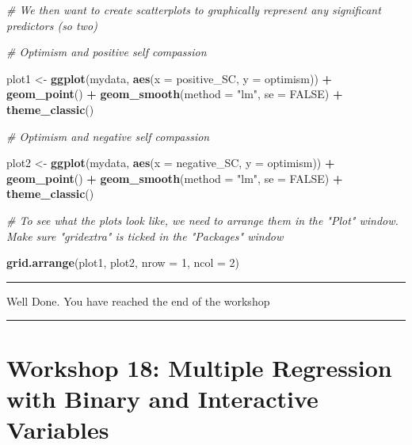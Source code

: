 \documentclass[
]{book}
\newenvironment{Shaded}{\begin{snugshade}}{\end{snugshade}}
\newcommand{\AttributeTok}[1]{\textcolor[rgb]{0.13,0.29,0.53}{#1}}
\newcommand{\CommentTok}[1]{\textcolor[rgb]{0.56,0.35,0.01}{\textit{#1}}}
\newcommand{\ConstantTok}[1]{\textcolor[rgb]{0.56,0.35,0.01}{#1}}
\newcommand{\DecValTok}[1]{\textcolor[rgb]{0.00,0.00,0.81}{#1}}
\newcommand{\FunctionTok}[1]{\textcolor[rgb]{0.13,0.29,0.53}{\textbf{#1}}}
\newcommand{\NormalTok}[1]{#1}
\newcommand{\OtherTok}[1]{\textcolor[rgb]{0.56,0.35,0.01}{#1}}
\newcommand{\SpecialCharTok}[1]{\textcolor[rgb]{0.81,0.36,0.00}{\textbf{#1}}}
\newcommand{\StringTok}[1]{\textcolor[rgb]{0.31,0.60,0.02}{#1}}
\begin{document}
\begin{Shaded}
\begin{Highlighting}[]
\CommentTok{\# We then want to create scatterplots to graphically represent any significant predictors (so two)}

\CommentTok{\# Optimism and positive self compassion}

\NormalTok{plot1 }\OtherTok{\textless{}{-}} \FunctionTok{ggplot}\NormalTok{(mydata, }\FunctionTok{aes}\NormalTok{(}\AttributeTok{x =}\NormalTok{ positive\_SC, }\AttributeTok{y =}\NormalTok{ optimism)) }\SpecialCharTok{+}
  \FunctionTok{geom\_point}\NormalTok{() }\SpecialCharTok{+}
  \FunctionTok{geom\_smooth}\NormalTok{(}\AttributeTok{method =} \StringTok{"lm"}\NormalTok{,}
              \AttributeTok{se =} \ConstantTok{FALSE}\NormalTok{) }\SpecialCharTok{+}
  \FunctionTok{theme\_classic}\NormalTok{()}

\CommentTok{\# Optimism and negative self compassion}

\NormalTok{plot2 }\OtherTok{\textless{}{-}} \FunctionTok{ggplot}\NormalTok{(mydata, }\FunctionTok{aes}\NormalTok{(}\AttributeTok{x =}\NormalTok{ negative\_SC, }\AttributeTok{y =}\NormalTok{ optimism)) }\SpecialCharTok{+}
  \FunctionTok{geom\_point}\NormalTok{() }\SpecialCharTok{+}
  \FunctionTok{geom\_smooth}\NormalTok{(}\AttributeTok{method =} \StringTok{"lm"}\NormalTok{,}
              \AttributeTok{se =} \ConstantTok{FALSE}\NormalTok{) }\SpecialCharTok{+}
  \FunctionTok{theme\_classic}\NormalTok{()}

\CommentTok{\# To see what the plots look like, we need to arrange them in the "Plot" window. Make sure "gridextra" is ticked in the "Packages" window}

\FunctionTok{grid.arrange}\NormalTok{(plot1, plot2, }\AttributeTok{nrow =} \DecValTok{1}\NormalTok{, }\AttributeTok{ncol =} \DecValTok{2}\NormalTok{)}
\end{Highlighting}
\end{Shaded}

\begin{center}\rule{0.5\linewidth}{0.5pt}\end{center}

Well Done.
You have reached the end of the workshop

\begin{center}\rule{0.5\linewidth}{0.5pt}\end{center}

\chapter{\texorpdfstring{\textbf{Workshop 18: Multiple Regression with Binary and Interactive Variables}}{Workshop 18: Multiple Regression with Binary and Interactive Variables}}\label{workshop-18-multiple-regression-with-binary-and-interactive-variables}
\end{document}
